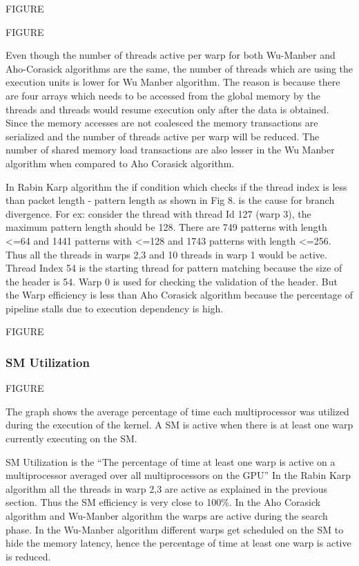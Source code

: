 FIGURE

FIGURE

Even though the number of threads active per warp for both Wu-Manber and Aho-Corasick algorithms are the same, the number of threads which are using the execution units is lower for Wu Manber algorithm. The reason is because there are four arrays which needs to be accessed from the global memory by the threads and threads would resume execution only after the data is obtained. Since the memory accesses are not coalesced the memory transactions are serialized and the number of threads active per warp will be reduced. The number of shared memory load transactions are also lesser in the Wu Manber algorithm when compared to Aho Corasick algorithm. 

In Rabin Karp algorithm the if condition which checks if the thread index is less than packet length - pattern length as shown in Fig 8. is the cause for branch divergence. For ex: consider the thread with thread Id 127 (warp 3), the maximum pattern length should be 128.  There are 749 patterns with length <=64  and 1441 patterns with <=128 and  1743 patterns with length <=256. Thus all the threads in warps 2,3 and 10 threads in warp 1 would be active. Thread Index 54 is the starting thread for pattern matching because the size of the header is 54. Warp 0 is used for checking the validation of the header. But the Warp efficiency is less than Aho Corasick algorithm because the percentage of pipeline stalls due to execution dependency is high.

FIGURE

\subsubsection{SM Utilization}

FIGURE

The graph shows the average percentage of time each multiprocessor was utilized during the execution of the kernel. A SM is active when there is at least one warp currently executing on the SM.      

SM Utilization is the “The percentage of time at least one warp is active on a multiprocessor averaged over all multiprocessors on the GPU”  In the Rabin Karp algorithm all the threads in warp 2,3 are active as explained in the previous section. Thus the SM efficiency is very close to 100\%. In the Aho Corasick algorithm and Wu-Manber algorithm the warps are active during the search phase. In the Wu-Manber algorithm different warps get scheduled on the SM to hide the memory latency, hence the percentage of time at least one warp is active is reduced.

